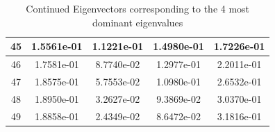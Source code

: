 \documentclass{article}
\begin{document}
\begin{table}[h!]
\begin{tabular}{|c|c|c|c|c|}
\hline                                                      
45 & 1.5561e-01 & 1.1221e-01 & 1.4980e-01 & 1.7226e-01 \\   
\hline                                                      
46 & 1.7581e-01 & 8.7740e-02 & 1.2977e-01 & 2.2011e-01 \\   
\hline                                                      
47 & 1.8575e-01 & 5.7553e-02 & 1.0980e-01 & 2.6532e-01 \\   
\hline                                                      
48 & 1.8950e-01 & 3.2627e-02 & 9.3869e-02 & 3.0370e-01 \\   
\hline                                                      
49 & 1.8858e-01 & 2.4349e-02 & 8.6472e-02 & 3.1816e-01 \\   
\hline                                                      
\end{tabular}                                               
\caption{Continued Eigenvectors corresponding to the 4 most dominant eigenvalues}                                    
\label{table:MyTableLa22bel}                                  
\end{table} 
	
\end{document}
